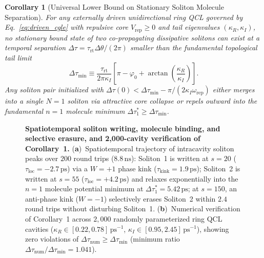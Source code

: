 \documentclass[11pt,letterpaper]{article}
\newtheorem{corollary}{Corollary}
\begin{document}
\begin{corollary}[Universal Lower Bound on Stationary Soliton Molecule Separation]
\label{cor:min_spacing}
For any externally driven unidirectional ring QCL governed by Eq.~\eqref{eq:driven_cgle} with repulsive core $V_{\mathrm{rep}} \ge 0$ and tail eigenvalues $(\kappa_R, \kappa_I)$, no stationary bound state of two co-propagating dissipative solitons can exist at a temporal separation $\Delta\tau = \tau_{\mathrm{rt}}\Delta\theta/(2\pi)$ smaller than the fundamental topological tail limit
\begin{equation}
\Delta\tau_{\min} \equiv \frac{\tau_{\mathrm{rt}}}{2\pi\kappa_I}\left[ \pi - \varphi_0 + \arctan\!\left(\frac{\kappa_R}{\kappa_I}\right) \right].
\label{eq:cor1_min_dtau}
\end{equation}
Any soliton pair initialized with $\Delta\tau(0) < \Delta\tau_{\min} - \pi/(2\kappa_I \omega_{\mathrm{rep}})$ either merges into a single $N = 1$ soliton via attractive core collapse or repels outward into the fundamental $n = 1$ molecule minimum $\Delta\tau_1^* \ge \Delta\tau_{\min}$.
\end{corollary}

\begin{figure}[t!]
\centering
\resizebox{0.97\textwidth}{!}{}
\caption{\textbf{Spatiotemporal soliton writing, molecule binding, and selective erasure, and 2,000-cavity verification of Corollary~1.} (\textbf{a})~Spatiotemporal trajectory of intracavity soliton peaks over $200$ round trips ($8.8\,\mathrm{ns}$): Soliton~1 is written at $s = 20$ ($\tau_{\mathrm{loc}} = -2.7\,\mathrm{ps}$) via a $W = +1$ phase kink ($\tau_{\mathrm{kink}} = 1.9\,\mathrm{ps}$); Soliton~2 is written at $s = 55$ ($\tau_{\mathrm{loc}} = +4.2\,\mathrm{ps}$) and relaxes exponentially into the $n = 1$ molecule potential minimum at $\Delta\tau_1^* = 5.42\,\mathrm{ps}$; at $s = 150$, an anti-phase kink ($W = -1$) selectively erases Soliton~2 within $2.4$ round trips without disturbing Soliton~1. (\textbf{b})~Numerical verification of Corollary~1 across $2{,}000$ randomly parameterized ring QCL cavities ($\kappa_R \in [0.22, 0.78]\,\mathrm{ps}^{-1}$, $\kappa_I \in [0.95, 2.45]\,\mathrm{ps}^{-1}$), showing zero violations of $\Delta\tau_{\mathrm{num}} \ge \Delta\tau_{\min}$ (minimum ratio $\Delta\tau_{\mathrm{num}}/\Delta\tau_{\min} = 1.041$).}
\label{fig:spatiotemporal_check}
\end{figure}
\end{document}
